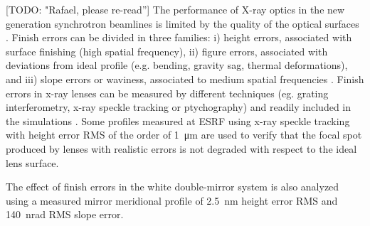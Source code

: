 \documentclass{iucr}              %
\newcommand{\todo}[1]{{\color{red}[TODO: "#1'']}}
\begin{document}
\todo{Rafael, please re-read}
The performance of X-ray optics in the new generation synchrotron beamlines is limited by the quality of the optical surfaces \cite{lengeler1999,Yabashi}. Finish errors can be divided in three families: i) height errors, associated with surface finishing (high spatial frequency), ii) figure errors, associated with deviations from ideal profile (e.g. bending, gravity sag, thermal deformations), and iii) slope errors or waviness, associated to medium spatial frequencies \cite{srio1992, signorato1997}. Finish errors in x-ray lenses can be measured by different techniques (eg. grating interferometry, x-ray speckle tracking or ptychography) and readily included in the simulations \cite{celestre2020}. Some profiles measured at ESRF using x-ray speckle tracking \cite{berujon2020} with height error RMS of the order of \SI{1}{\micro\meter} are used to verify that the focal spot produced by lenses with realistic errors is not degraded with respect to the ideal lens surface. 


The effect of finish errors in the white double-mirror system is also analyzed using a measured mirror meridional profile of \SI{2.5}{\nano\meter} height error RMS and \SI{140}{\nano\radian} RMS slope error. 
\end{document}
